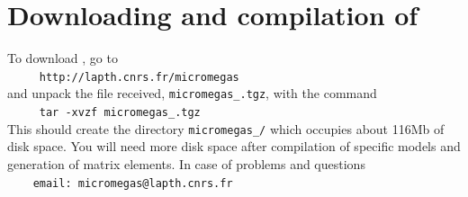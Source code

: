 \documentclass[12pt,a4paper]{article}
\begin{document}
  
\section{Downloading and compilation of \micro}
To   download  \micro, go to    \\  
\verb|     http://lapth.cnrs.fr/micromegas|\\
and unpack the file received, \verb|micromegas_|\VERSION\verb|.tgz|, with the command\\
\verb|     tar -xvzf micromegas_|\VERSION\verb|.tgz|\\
This should create the directory \verb|micromegas_|\VERSION\verb|/| which occupies about 116Mb of disk space. You will need more disk space after compilation of
specific models and generation of matrix elements.
In case of problems and questions\\
\verb|    email: micromegas@lapth.cnrs.fr|\\
\end{document}
